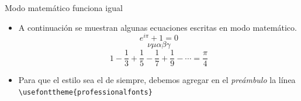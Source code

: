 \documentclass{beamer}
\begin{document}
    \begin{frame}[fragile]{Modo matemático funciona igual}
        \begin{itemize}
            \justifying
            \item A continuación se muestran algunas ecuaciones escritas en modo matemático.
            \vspace{9pt}
            \begin{equation}
                e^{i\pi} + 1 = 0
            \end{equation}
            \begin{equation}
                \nu\mu\alpha\beta\gamma
            \end{equation}
            \begin{equation}
                1 - \frac{1}{3} + \frac{1}{5} - \frac{1}{7} + \frac{1}{9} - \cdots = \frac{\pi}{4}
            \end{equation}
            \vspace{3pt}
            \item Para que el estilo sea el de siempre, debemos agregar en el
             \textsl{preámbulo} la línea {\color{mygreen} \verb|\usefonttheme{|}\verb|professionalfonts|{\color{mygreen}\verb|}|}
        \end{itemize}
    \end{frame}
\end{document}
